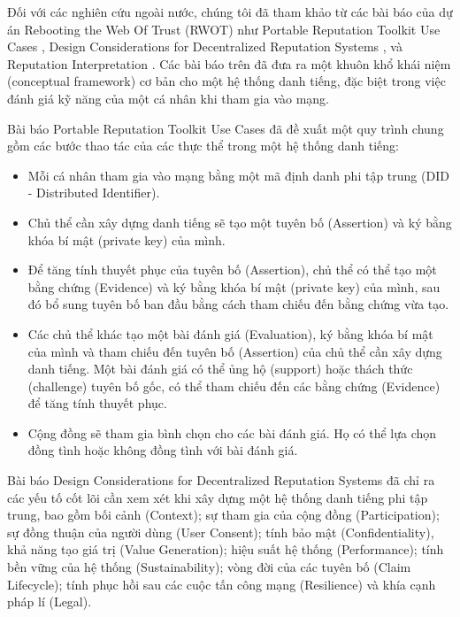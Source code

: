 \documentclass{article}[14pt]
\begin{document}
{            \par
            Đối với các nghiên cứu ngoài nước, chúng tôi đã tham khảo từ các bài báo của dự án Rebooting the Web Of Trust (RWOT) như Portable Reputation Toolkit Use Cases \cite{reputation-toolkit}, Design Considerations for Decentralized Reputation Systems \cite{reputation-design}, và Reputation Interpretation \cite{reputation-interpretation}. Các bài báo trên đã đưa ra một khuôn khổ khái niệm (conceptual framework) cơ bản cho một hệ thống danh tiếng, đặc biệt trong việc đánh giá kỹ năng của một cá nhân khi tham gia vào mạng. 
            \par
            Bài báo Portable Reputation Toolkit Use Cases \cite{reputation-toolkit} đã đề xuất một quy trình chung gồm các bước thao tác của các thực thể trong một hệ thống danh tiếng:
            \begin{itemize}
                \item Mỗi cá nhân tham gia vào mạng bằng một mã định danh phi tập trung (DID - Distributed Identifier). 
                \item Chủ thể cần xây dựng danh tiếng sẽ tạo một tuyên bố (Assertion) và ký bằng khóa bí mật (private key) của mình. 
                \item Để tăng tính thuyết phục của tuyên bố (Assertion), chủ thể có thể tạo một bằng chứng (Evidence) và ký bằng khóa bí mật (private key) của mình, sau đó bổ sung tuyên bố ban đầu bằng cách tham chiếu đến bằng chứng vừa tạo.
                \item Các chủ thể khác tạo một bài đánh giá (Evaluation), ký bằng khóa bí mật của mình và tham chiếu đến tuyên bố (Assertion) của chủ thể cần xây dựng danh tiếng. Một bài đánh giá có thể ủng hộ (support) hoặc thách thức (challenge) tuyên bố gốc, có thể tham chiếu đến các bằng chứng (Evidence) để tăng tính thuyết phục. 
                \item Cộng đồng sẽ tham gia bình chọn cho các bài đánh giá. Họ có thể lựa chọn đồng tình hoặc không đồng tình với bài đánh giá. 
            \end{itemize}
            Bài báo Design Considerations for Decentralized Reputation Systems \cite{reputation-design} đã chỉ ra các yếu tố cốt lõi cần xem xét khi xây dựng một hệ thống danh tiếng phi tập trung, bao gồm bối cảnh (Context); sự tham gia của cộng đồng (Participation); sự đồng thuận của người dùng (User Consent); tính bảo mật (Confidentiality), khả năng tạo giá trị (Value Generation); hiệu suất hệ thống (Performance); tính bền vững của hệ thống (Sustainability); vòng đời của các tuyên bố (Claim Lifecycle); tính phục hồi sau các cuộc tấn công mạng (Resilience) và khía cạnh pháp lí (Legal). 
}
\end{document}
